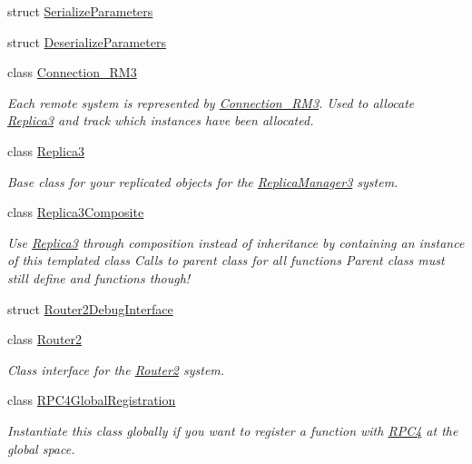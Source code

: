 \begin{DoxyCompactItemize}
\item 
struct \hyperlink{struct_rak_net_1_1_serialize_parameters}{Serialize\-Parameters}
\item 
struct \hyperlink{struct_rak_net_1_1_deserialize_parameters}{Deserialize\-Parameters}
\item 
class \hyperlink{class_rak_net_1_1_connection___r_m3}{Connection\-\_\-\-R\-M3}
\begin{DoxyCompactList}\small\item\em Each remote system is represented by \hyperlink{class_rak_net_1_1_connection___r_m3}{Connection\-\_\-\-R\-M3}. Used to allocate \hyperlink{class_rak_net_1_1_replica3}{Replica3} and track which instances have been allocated. \end{DoxyCompactList}\item 
class \hyperlink{class_rak_net_1_1_replica3}{Replica3}
\begin{DoxyCompactList}\small\item\em Base class for your replicated objects for the \hyperlink{class_rak_net_1_1_replica_manager3}{Replica\-Manager3} system. \end{DoxyCompactList}\item 
class \hyperlink{class_rak_net_1_1_replica3_composite}{Replica3\-Composite}
\begin{DoxyCompactList}\small\item\em Use \hyperlink{class_rak_net_1_1_replica3}{Replica3} through composition instead of inheritance by containing an instance of this templated class Calls to parent class for all functions Parent class must still define and functions though! \end{DoxyCompactList}\item 
struct \hyperlink{struct_rak_net_1_1_router2_debug_interface}{Router2\-Debug\-Interface}
\item 
class \hyperlink{class_rak_net_1_1_router2}{Router2}
\begin{DoxyCompactList}\small\item\em Class interface for the \hyperlink{class_rak_net_1_1_router2}{Router2} system. \end{DoxyCompactList}\item 
class \hyperlink{class_rak_net_1_1_r_p_c4_global_registration}{R\-P\-C4\-Global\-Registration}
\begin{DoxyCompactList}\small\item\em Instantiate this class globally if you want to register a function with \hyperlink{class_rak_net_1_1_r_p_c4}{R\-P\-C4} at the global space. \end{DoxyCompactList}\item 

\end{DoxyCompactItemize}
